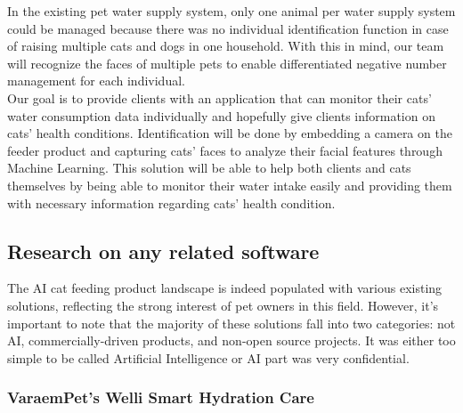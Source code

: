 \documentclass[conference]{IEEEtran}
\begin{document}
In the existing pet water supply system, only one animal per water supply system could be managed because there was no individual identification function in case of raising multiple cats and dogs in one household. With this in mind, our team will recognize the faces of multiple pets to enable differentiated negative number management for each individual. \\

Our goal is to provide clients with an application that can monitor their cats’ water consumption data individually and hopefully give clients information on cats’ health conditions. Identification will be done by embedding a camera on the feeder product and capturing cats’ faces to analyze their facial features through Machine Learning. This solution will be able to help both clients and cats themselves by being able to monitor their water intake easily and providing them with necessary information regarding cats' health condition. \\

\subsection{Research on any related software}

The AI cat feeding product landscape is indeed populated with various existing solutions, reflecting the strong interest of pet owners in this field. However, it's important to note that the majority of these solutions fall into two categories: not AI, commercially-driven products, and non-open source projects. It was either too simple to be called Artificial Intelligence or AI part was very confidential.
\newline

\subsubsection*{VaraemPet's Welli Smart Hydration Care}
\end{document}
